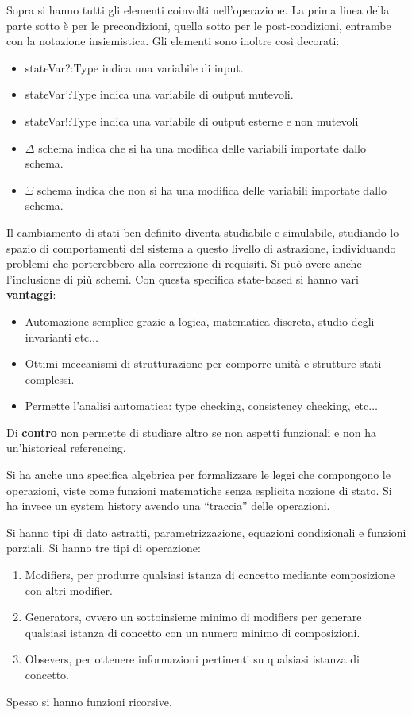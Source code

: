 Sopra si hanno tutti gli elementi coinvolti nell'operazione. La prima linea della
parte sotto è per le precondizioni, quella sotto per le post-condizioni, entrambe
con la notazione insiemistica. Gli elementi sono inoltre così decorati:
\begin{itemize}
      \item stateVar?:Type indica una variabile di input.
      \item stateVar':Type indica una variabile di output mutevoli.
      \item stateVar!:Type indica una variabile di output esterne e non mutevoli
      \item $\Delta$ schema indica che si ha una modifica delle variabili importate
            dallo schema.
      \item $\Xi$ schema indica che non si ha una modifica delle variabili importate
            dallo schema.
\end{itemize}
Il cambiamento di stati ben definito diventa studiabile e simulabile, studiando
lo spazio di comportamenti del sistema a questo livello di astrazione,
individuando problemi che porterebbero alla correzione di requisiti. Si può avere
anche l'inclusione di più schemi. 
Con questa specifica state-based si hanno vari \textbf{vantaggi}:
\begin{itemize}
      \item Automazione semplice grazie a logica, matematica discreta, studio
            degli invarianti etc$\dots$
      \item Ottimi meccanismi di strutturazione per comporre unità e strutture
            stati complessi.
      \item Permette l'analisi automatica: type checking, consistency checking,
            etc$\dots$
\end{itemize}
Di \textbf{contro} non permette di studiare altro se non aspetti funzionali e non ha
un'historical referencing.

Si ha anche una specifica algebrica per formalizzare le leggi che compongono le
operazioni, viste come funzioni matematiche senza esplicita nozione di stato.
Si ha invece un system history avendo una “traccia” delle operazioni.

Si hanno tipi di dato astratti, parametrizzazione, equazioni condizionali e funzioni
parziali. Si hanno tre tipi di operazione:
\begin{enumerate}
      \item Modifiers, per produrre qualsiasi istanza di concetto mediante
            composizione con altri modifier.
      \item Generators, ovvero un sottoinsieme minimo di modifiers per generare
            qualsiasi istanza di concetto con un numero minimo di composizioni.
      \item Obsevers, per ottenere informazioni pertinenti su qualsiasi istanza
            di concetto.
\end{enumerate}
Spesso si hanno funzioni ricorsive.


